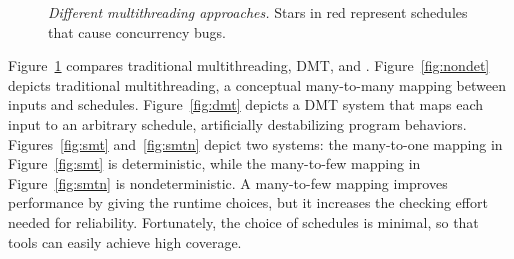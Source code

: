 \begin{figure}[t]
\begin{center}
\vspace{-.05in}
\caption{{\em Different multithreading approaches.} Stars in red represent
  schedules that cause concurrency bugs.} \label{fig:mt}
\vspace{-.2in}
\end{center}
\end{figure}

Figure~\ref{fig:mt} compares traditional multithreading, DMT, and \smt.
Figure~\ref{fig:nondet} depicts traditional multithreading, a conceptual
many-to-many mapping between inputs and schedules.  Figure~\ref{fig:dmt}
depicts a DMT system that maps each input to an arbitrary schedule,
artificially destabilizing program behaviors.  Figures~\ref{fig:smt}
and~\ref{fig:smtn} depict two \smt systems: the many-to-one mapping in
Figure~\ref{fig:smt} is deterministic, while the many-to-few mapping in
Figure~\ref{fig:smtn} is nondeterministic.  A many-to-few mapping improves
performance by giving the runtime choices, but it
increases the checking effort needed for reliability.  Fortunately, the
choice of schedules is minimal, so that tools can easily achieve
high coverage.

